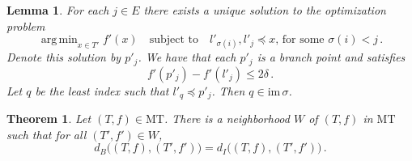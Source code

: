 \documentclass[10pt,a4paper]{amsart}
\newtheorem{theorem}{Theorem}
\newtheorem{lemma}{Lemma}
\newcommand{\MT}{\mathrm{MT}}
\DeclareMathOperator*{\argmin}{arg\,min}
\newcommand{\im}{\mathrm{im}\,}
\begin{document}
\begin{lemma}
    \label{lem:plemma}
    For each $j \in E$ there exists a unique solution to the optimization problem
    \begin{equation*}
        \argmin_{x \in T'} f'(x) \quad \text{subject to} \quad l'_{\sigma(i)}, l'_j \preceq x \text{, for some }\sigma(i) < j \,.
    \end{equation*}
    Denote this solution by $p'_j$. We have that each $p'_j$ is a branch point and satisfies
    \begin{equation*}
        f'(p'_j) - f'(l'_j) \leq 2\delta\,.
    \end{equation*}
    Let $q$ be the least index such that $l'_q \preceq p'_j$. Then $q \in \im \sigma$.
\end{lemma}

\begin{theorem}
    \label{thm:localeq}
    Let $(T,f)\in\MT$. There is a neighborhood $W$ of $(T,f)$ in $\MT$ such that for all $(T',f')\in W$,
    \begin{equation*}
        d_B\big((T,f),(T',f')\big) = d_I\big((T,f),(T',f')\big)\,.
    \end{equation*}
\end{theorem}
\end{document}
